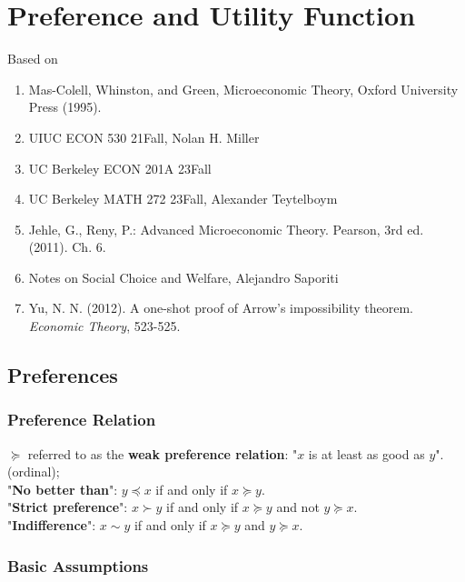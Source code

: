 \documentclass[11pt]{elegantbook}
\begin{document}
\chapter{Preference and Utility Function}
Based on
\begin{enumerate}[$\circ$]
    \item Mas-Colell, Whinston, and Green, Microeconomic Theory, Oxford University Press (1995).
    \item UIUC ECON 530 21Fall, Nolan H. Miller
    \item UC Berkeley ECON 201A 23Fall
    \item UC Berkeley MATH 272 23Fall, Alexander Teytelboym
    \item  Jehle, G., Reny, P.: Advanced Microeconomic Theory. Pearson, 3rd ed. (2011). Ch. 6.
    \item Notes on Social Choice and Welfare, Alejandro Saporiti
    \item Yu, N. N. (2012). A one-shot proof of Arrow's impossibility theorem. \textit{Economic Theory}, 523-525.
\end{enumerate}


\section{Preferences}

\subsection{Preference Relation}
\begin{definition}
    \normalfont
    $\succeq$ referred to as the \textbf{weak preference relation}: "$x$ is at least as good as $y$". (ordinal);\\
    "\textbf{No better than}": $y \preceq x$ if and only if $x \succeq y$.\\
    "\textbf{Strict preference}": $x \succ y$ if and only if $x \succeq y$ and not $y \succeq x$.\\
    "\textbf{Indifference}": $x \sim y$ if and only if $x \succeq y$ and $y \succeq x$.
\end{definition}


\subsection{Basic Assumptions}
\end{document}
